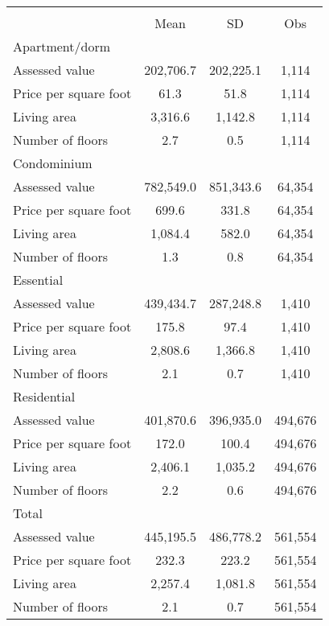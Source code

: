 {
\def\sym#1{\ifmmode^{#1}\else\(^{#1}\)\fi}
\begin{tabular}{l*{1}{ccc}}
\toprule
                &\multicolumn{3}{c}{}         \\
                &     Mean&       SD&      Obs\\
\midrule
Apartment/dorm  &         &         &         \\
Assessed value  &202,706.7&202,225.1&    1,114\\
Price per square foot&     61.3&     51.8&    1,114\\
Living area     &  3,316.6&  1,142.8&    1,114\\
Number of floors&      2.7&      0.5&    1,114\\
\midrule
Condominium     &         &         &         \\
Assessed value  &782,549.0&851,343.6&   64,354\\
Price per square foot&    699.6&    331.8&   64,354\\
Living area     &  1,084.4&    582.0&   64,354\\
Number of floors&      1.3&      0.8&   64,354\\
\midrule
Essential       &         &         &         \\
Assessed value  &439,434.7&287,248.8&    1,410\\
Price per square foot&    175.8&     97.4&    1,410\\
Living area     &  2,808.6&  1,366.8&    1,410\\
Number of floors&      2.1&      0.7&    1,410\\
\midrule
Residential     &         &         &         \\
Assessed value  &401,870.6&396,935.0&  494,676\\
Price per square foot&    172.0&    100.4&  494,676\\
Living area     &  2,406.1&  1,035.2&  494,676\\
Number of floors&      2.2&      0.6&  494,676\\
\midrule
Total           &         &         &         \\
Assessed value  &445,195.5&486,778.2&  561,554\\
Price per square foot&    232.3&    223.2&  561,554\\
Living area     &  2,257.4&  1,081.8&  561,554\\
Number of floors&      2.1&      0.7&  561,554\\
\bottomrule
\end{tabular}
}
